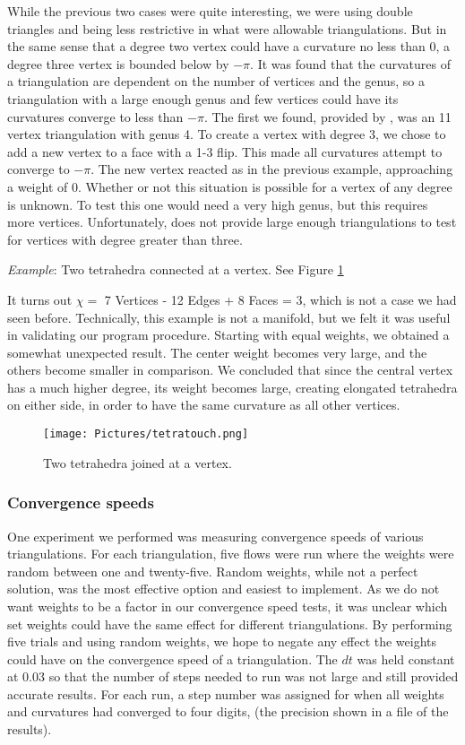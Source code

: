 \documentclass[12pt]{article}
\begin{document}
 While the previous two cases were quite interesting, we were using double triangles and being less restrictive in what were allowable triangulations. But in the same sense that a degree two vertex could have a curvature no less than 0, a degree three vertex is bounded below by $-\pi$. It was found that the curvatures of a triangulation are dependent on the number of vertices and the genus, so a triangulation with a large enough genus and few vertices could have its curvatures converge to less than $-\pi$. The first we found, provided by \cite{lutzmanifold}, was an 11 vertex triangulation with genus 4. To create a vertex with degree 3, we chose to add a new vertex to a face with a 1-3 flip. This made all curvatures attempt to converge to $-\pi$. The new vertex reacted as in the previous example, approaching a weight of 0. Whether or not this situation is possible for a vertex of any degree is unknown. To test this one would need a very high genus, but this requires more vertices. Unfortunately, \cite{lutzmanifold} does not provide large enough triangulations to test for vertices with degree greater than three.

 \textit{Example}: Two tetrahedra connected at a vertex. See Figure \ref{fig:tt}

 It turns out $\chi = $ 7 Vertices - 12 Edges + 8 Faces = 3, which is not a case we had seen before. Technically, this example is not a manifold, but we felt it was useful in validating our program procedure. Starting with equal weights, we obtained a somewhat unexpected result. The center weight becomes very large, and the others become smaller in comparison. We concluded that since the central vertex has a much higher degree, its weight becomes large, creating elongated tetrahedra on either side, in order to have the same curvature as all other vertices.

\begin{figure}
\texttt{[image: Pictures/tetratouch.png]}
\caption{Two tetrahedra joined at a vertex.}
\label{fig:tt}
\end{figure}

\subsubsection{Convergence speeds}

One experiment we performed was measuring convergence speeds of various triangulations. For each triangulation, five flows were run where the weights were random between one and twenty-five. Random weights, while not a perfect solution, was the most effective option and easiest to implement. As we do not want weights to be a factor in our convergence speed tests, it was unclear which set weights could have the same effect for different triangulations. By performing five trials and using random weights, we hope to negate any effect the weights could have on the convergence speed of a triangulation. The $dt$ was held constant at 0.03 so that the number of steps needed to run was not large and still provided accurate results. For each run, a step number was assigned for when all weights and curvatures had converged to four digits, (the precision shown in a file of the results).
\end{document}
